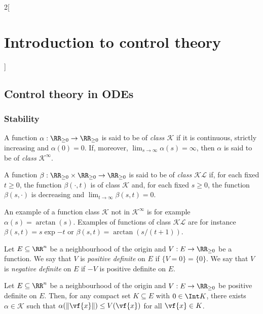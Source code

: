 \documentclass[../../../main_math.tex]{subfiles}
\begin{document}
\begin{multicols}{2}[\section{Introduction to control theory}]
  \subsection{Control theory in ODEs}
  \subsubsection{Stability}
  \begin{definition}
    A function $\alpha: \RR_{\geq 0} \to \RR_{\geq 0}$ is said to be of \emph{class $\mathcal{K}$} if it is continuous, strictly increasing and $\alpha(0) = 0$. If, moreover, $\displaystyle \lim_{s \to \infty} \alpha(s) = \infty$, then $\alpha$ is said to be of \emph{class $\mathcal{K}^\infty$}.
  \end{definition}
  \begin{definition}
    A function $\beta: \RR_{\geq 0} \times \RR_{\geq 0} \to \RR_{\geq 0}$ is said to be of \emph{class $\mathcal{KL}$} if, for each fixed $t \geq 0$, the function $\beta(\cdot, t)$ is of class $\mathcal{K}$ and, for each fixed $s \geq 0$, the function $\beta(s, \cdot)$ is decreasing and $\displaystyle \lim_{t \to \infty} \beta(s, t) = 0$.
  \end{definition}
  \begin{remark}
    An example of a function class $\mathcal{K}$ not in $\mathcal{K}^\infty$ is for example $\alpha(s)=\arctan(s)$. Examples of functions of class $\mathcal{KL}$ are for instance $\beta(s, t) = s\exp{-t}$ or $\beta(s, t) = \arctan(s/(t+1))$.
  \end{remark}
  \begin{definition}
    Let $E\subseteq \RR^n$ be a neighbourhood of the origin and $V: E \to \RR_{\geq 0}$ be a function. We say that $V$ is \emph{positive definite} on $E$ if $\{V=0\} = \{0\}$. We say that $V$ is \emph{negative definite} on $E$ if $-V$ is positive definite on $E$.
  \end{definition}
  \begin{lemma}
    Let $E\subseteq \RR^n$ be a neighbourhood of the origin and $V: E \to \RR_{\geq 0}$ be positive definite on $E$. Then, for any compact set $K \subseteq E$ with $0\in \Int K$, there exists $\alpha \in \mathcal{K}$ such that $\alpha(\norm{\vf{x}}) \leq V(\vf{x})$ for all $\vf{x} \in K$.

\end{lemma}
\end{multicols}
\end{document}
